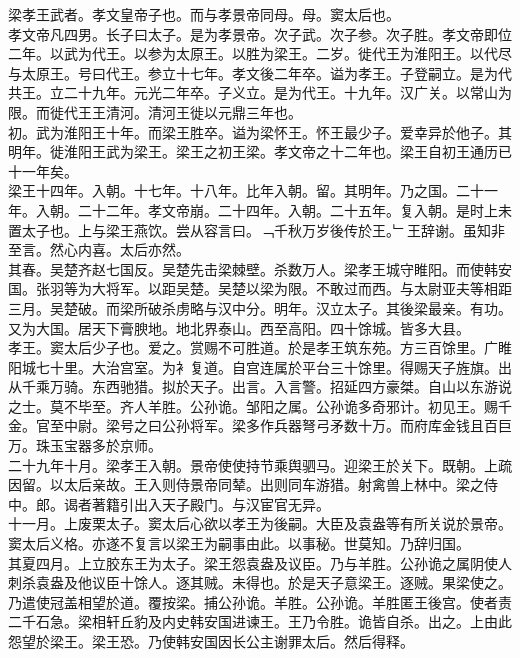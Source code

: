 \documentclass{zhvt-classic}
\begin{document}
\hspace*{2em}梁孝王武者。孝文皇帝子也。而与孝景帝同母。母。窦太后也。\\
\hspace*{2em}孝文帝凡四男。长子曰太子。是为孝景帝。次子武。次子参。次子胜。孝文帝即位二年。以武为代王。以参为太原王。以胜为梁王。二岁。徙代王为淮阳王。以代尽与太原王。号曰代王。参立十七年。孝文後二年卒。谥为孝王。子登嗣立。是为代共王。立二十九年。元光二年卒。子义立。是为代王。十九年。汉广关。以常山为限。而徙代王王清河。清河王徙以元鼎三年也。\\
\hspace*{2em}初。武为淮阳王十年。而梁王胜卒。谥为梁怀王。怀王最少子。爱幸异於他子。其明年。徙淮阳王武为梁王。梁王之初王梁。孝文帝之十二年也。梁王自初王通历已十一年矣。\\
\hspace*{2em}梁王十四年。入朝。十七年。十八年。比年入朝。留。其明年。乃之国。二十一年。入朝。二十二年。孝文帝崩。二十四年。入朝。二十五年。复入朝。是时上未置太子也。上与梁王燕饮。尝从容言曰。﹁千秋万岁後传於王。﹂王辞谢。虽知非至言。然心内喜。太后亦然。\\
\hspace*{2em}其春。吴楚齐赵七国反。吴楚先击梁棘壁。杀数万人。梁孝王城守睢阳。而使韩安国。张羽等为大将军。以距吴楚。吴楚以梁为限。不敢过而西。与太尉亚夫等相距三月。吴楚破。而梁所破杀虏略与汉中分。明年。汉立太子。其後梁最亲。有功。又为大国。居天下膏腴地。地北界泰山。西至高阳。四十馀城。皆多大县。\\
\hspace*{2em}孝王。窦太后少子也。爱之。赏赐不可胜道。於是孝王筑东苑。方三百馀里。广睢阳城七十里。大治宫室。为衤复道。自宫连属於平台三十馀里。得赐天子旌旗。出从千乘万骑。东西驰猎。拟於天子。出言。入言警。招延四方豪桀。自山以东游说之士。莫不毕至。齐人羊胜。公孙诡。邹阳之属。公孙诡多奇邪计。初见王。赐千金。官至中尉。梁号之曰公孙将军。梁多作兵器弩弓矛数十万。而府库金钱且百巨万。珠玉宝器多於京师。\\
\hspace*{2em}二十九年十月。梁孝王入朝。景帝使使持节乘舆驷马。迎梁王於关下。既朝。上疏因留。以太后亲故。王入则侍景帝同辇。出则同车游猎。射禽兽上林中。梁之侍中。郎。谒者著籍引出入天子殿门。与汉宦官无异。\\
\hspace*{2em}十一月。上废栗太子。窦太后心欲以孝王为後嗣。大臣及袁盎等有所关说於景帝。窦太后义格。亦遂不复言以梁王为嗣事由此。以事秘。世莫知。乃辞归国。\\
\hspace*{2em}其夏四月。上立胶东王为太子。梁王怨袁盎及议臣。乃与羊胜。公孙诡之属阴使人刺杀袁盎及他议臣十馀人。逐其贼。未得也。於是天子意梁王。逐贼。果梁使之。乃遣使冠盖相望於道。覆按梁。捕公孙诡。羊胜。公孙诡。羊胜匿王後宫。使者责二千石急。梁相轩丘豹及内史韩安国进谏王。王乃令胜。诡皆自杀。出之。上由此怨望於梁王。梁王恐。乃使韩安国因长公主谢罪太后。然后得释。\\
\end{document}
